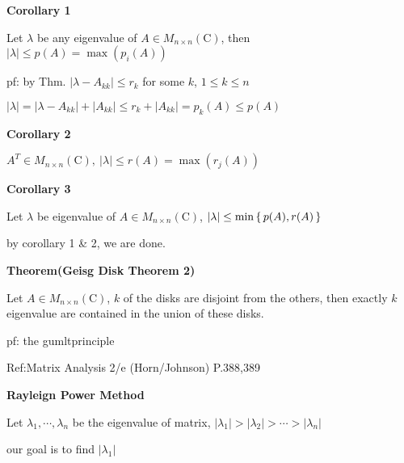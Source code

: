 \textbf{Corollary 1}

\begin{tcolorbox}
	Let $\lambda$ be any eigenvalue of $A \in M_{n \times n}(\mathrm{C})$, then $|\lambda| \leq p(A) = \max(p_i(A))$
	
	pf: by Thm. $|\lambda - A_{kk}| \leq r_k$ for some $k$, $1 \leq k \leq n$
	
	$|\lambda| = |\lambda - A_{kk}| + |A_{kk}| \leq r_k + |A_{kk}| = p_k(A) \leq p(A)$
\end{tcolorbox}

\textbf{Corollary 2}

\begin{tcolorbox}
	$A^T \in M_{n \times n}(\mathrm{C}),~ |
\lambda| \leq r(A) = \max(r_j(A))$
\end{tcolorbox}

\textbf{Corollary 3}

\begin{tcolorbox}
	Let $\lambda$ be eigenvalue of $A \in M_{n \times n}(\mathrm{C})$, $|\lambda| \leq \min\left\{ \,p(A),r(A) \,\right\}$
	
	by corollary 1 \& 2, we are done.
\end{tcolorbox}


\textbf{Theorem(Geisg Disk Theorem 2)}

\begin{tcolorbox}
	Let $A \in M_{n \times n}(\mathrm{C})$, $k$ of the disks are disjoint from the others, then exactly $k$ eigenvalue are contained in the union of these disks.
	
	pf: the gumltprinciple
	
	Ref:Matrix Analysis 2/e (Horn/Johnson) P.388,389
\end{tcolorbox}

\newpage

\textbf{Rayleign Power Method}

Let $\lambda_1,\cdots,\lambda_n$ be the eigenvalue of matrix, $|\lambda_1| > |\lambda_2|> \cdots > |\lambda_n|$
	
	our goal is to find $|\lambda_1|$

